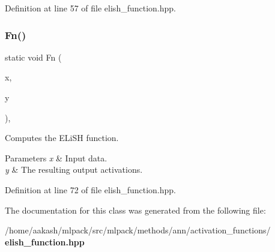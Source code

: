 Definition at line 57 of file elish\+\_\+function.\+hpp.

\mbox{\label{classmlpack_1_1ann_1_1ElishFunction_af6cf5da90eb6312e3e25c9b8bd9c3527}} 
\subsubsection{Fn()\hspace{0.1cm}{\footnotesize\ttfamily [2/2]}}
{\footnotesize\ttfamily static void Fn (\begin{DoxyParamCaption}\item[{const Input\+Vec\+Type \&}]{x,  }\item[{Output\+Vec\+Type \&}]{y }\end{DoxyParamCaption})\hspace{0.3cm}{\ttfamily [inline]}, {\ttfamily [static]}}



Computes the E\+Li\+SH function. 


\begin{DoxyParams}{Parameters}
{\em x} & Input data. \\
\hline
{\em y} & The resulting output activations. \\
\hline
\end{DoxyParams}


Definition at line 72 of file elish\+\_\+function.\+hpp.



The documentation for this class was generated from the following file\+:\begin{DoxyCompactItemize}
\item 
/home/aakash/mlpack/src/mlpack/methods/ann/activation\+\_\+functions/\textbf{ elish\+\_\+function.\+hpp}\end{DoxyCompactItemize}
